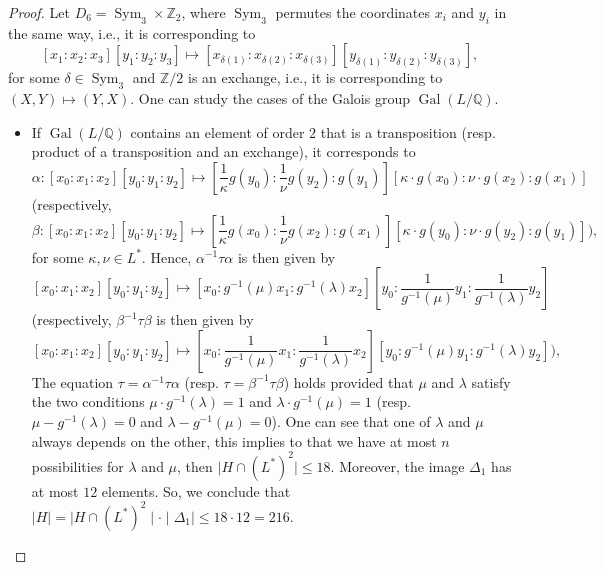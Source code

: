 \documentclass[leqno,12pt]{amsart} %
\newcommand{\Z}{\ensuremath{\mathbb{Z}}}
\newcommand{\Q}{\ensuremath{\mathbb{Q} }}
\DeclareMathOperator{\Gal}{Gal}
\DeclareMathOperator{\sym}{Sym}
\begin{document}
\begin{proof}
Let $D_6= \sym_3 \times \Z_2$, where $\sym_3$ permutes the coordinates $x_i$ and $y_i$ in the same way, i.e., it is corresponding to 
\[[x_1:x_2:x_3][y_1:y_2:y_3]\mapsto [ x_{\delta(1)}: x_{\delta(2)} : x_{\delta(3)} ][ y_{\delta(1)}:y_{\delta(2)}:y_{\delta(3)}], \]
for some $\delta\in\sym_3$ and $\Z/2$ is an exchange, i.e., it is corresponding to $(X,Y)\mapsto (Y,X)$. One can study the cases of the Galois group $\Gal(L/\Q)$. 
\begin{itemize}
  \item [a)] If $\Gal(L/\Q)$ contains an element of order $2$ that is a transposition (resp. product of a transposition and an exchange), it corresponds to 
\[\alpha:[x_{0}:x_{1}:x_{2}][y_{0}:y_{1}:y_{2}]\mapsto [\frac{1}{\kappa}g(y_{0}):\frac{1}{\nu}g(y_{2}):g(y_{1})][\kappa\cdot g(x_{0}):\nu \cdot g(x_{2}):g(x_{1})]\]
(respectively, 
 \[\beta:[x_{0}:x_{1}:x_{2}][y_{0}:y_{1}:y_{2}]\mapsto [\frac{1}{\kappa}g(x_{0}):\frac{1}{\nu}g(x_{2}):g(x_{1})][\kappa\cdot g(y_{0}):\nu \cdot g(y_{2}):g(y_{1})]),\]
for some $\kappa,\nu\in L^*$. Hence, $\alpha^{-1}\tau \alpha$ is then given by 
\[[x_{0}:x_{1}:x_{2}][y_{0}:y_{1}:y_{2}]\mapsto [ x_{0}: g^{-1}(\mu)x_{1} : g^{-1}(\lambda)x_{2}][ y_{0}:\frac{1}{g^{-1}(\mu)}y_{1}:\frac{1}{g^{-1}(\lambda)}y_{2}] \]
(respectively, $\beta^{-1}\tau \beta$ is then given by 
\[[x_{0}:x_{1}:x_{2}][y_{0}:y_{1}:y_{2}]\mapsto [ x_{0}: \frac{1}{g^{-1}(\mu)}x_{1} : \frac{1}{g^{-1}(\lambda)}x_{2}][ y_{0}:g^{-1}(\mu)y_{1}:g^{-1}(\lambda)y_{2}]),\]
The equation $\tau=\alpha^{-1}\tau \alpha$ (resp. $\tau=\beta^{-1}\tau \beta$) holds provided that $\mu$ and $\lambda$ satisfy the two conditions $\mu\cdot g^{-1}(\lambda)=1$ and $\lambda\cdot g^{-1}(\mu)=1$ (resp. $\mu- g^{-1}(\lambda)=0$ and $\lambda- g^{-1}(\mu)=0$). One can see that one of $\lambda$ and $\mu$ always depends on the other, this implies to that we have at most $n$ possibilities for $\lambda$ and $\mu$, then $\mid H\cap\left(L^{*}\right)^2\mid \le  18$. Moreover, the image $\Delta_1$ has at most $12$ elements. So, we conclude that $\mid H\mid =\mid H\cap\left(L^{*}\right)^2\mid \cdot \mid \Delta_1\mid \le  18\cdot 12=216$.\\


\end{itemize}
\end{proof}
\end{document}
